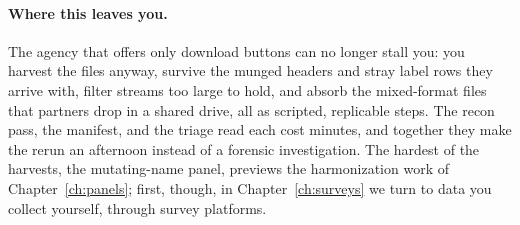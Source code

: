 \documentclass[
    a4paper,
    fontsize=10pt,
    twoside=true,
    numbers=noenddot,
]{kaobook}
\begin{document}
\paragraph{Where this leaves you.} The agency that offers only download buttons can no longer stall you: you harvest the files anyway, survive the munged headers and stray label rows they arrive with, filter streams too large to hold, and absorb the mixed-format files that partners drop in a shared drive, all as scripted, replicable steps. The recon pass, the manifest, and the triage read each cost minutes, and together they make the rerun an afternoon instead of a forensic investigation. The hardest of the harvests, the mutating-name panel, previews the harmonization work of Chapter~\ref{ch:panels}; first, though, in Chapter~\ref{ch:surveys} we turn to data you collect yourself, through survey platforms.
\end{document}
